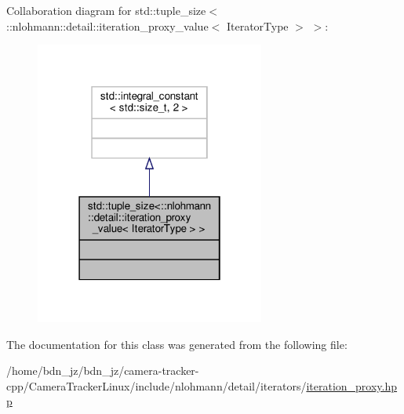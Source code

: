Collaboration diagram for std\+:\+:tuple\+\_\+size$<$\+:\+:nlohmann\+:\+:detail\+:\+:iteration\+\_\+proxy\+\_\+value$<$ Iterator\+Type $>$ $>$\+:
\nopagebreak
\begin{figure}[H]
\begin{center}
\leavevmode
\includegraphics[width=214pt]{classstd_1_1tuple__size_3_1_1nlohmann_1_1detail_1_1iteration__proxy__value_3_01_iterator_type_01_4_01_4__coll__graph}
\end{center}
\end{figure}


The documentation for this class was generated from the following file\+:\begin{DoxyCompactItemize}
\item 
/home/bdn\+\_\+jz/bdn\+\_\+jz/camera-\/tracker-\/cpp/\+Camera\+Tracker\+Linux/include/nlohmann/detail/iterators/\hyperlink{iteration__proxy_8hpp}{iteration\+\_\+proxy.\+hpp}\end{DoxyCompactItemize}
